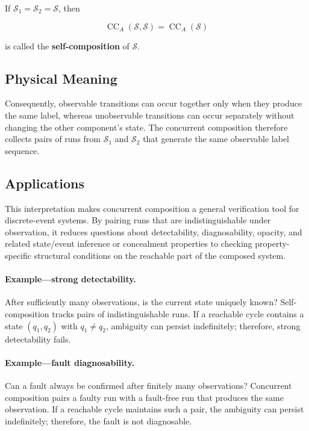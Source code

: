 \documentclass[11pt]{article}
\begin{document}
If $\mathcal S_1=\mathcal S_2=\mathcal S$, then

\[
\operatorname{CC}_{A}(\mathcal S,\mathcal S)
=\operatorname{CC}_{A}(\mathcal S)
\]

is called the \textbf{self-composition} of $\mathcal S$.

\subsection{Physical Meaning}

Consequently, observable transitions can occur together only when they produce the same label, whereas unobservable transitions can occur separately without changing the other component's state. The concurrent composition therefore collects pairs of runs from $\mathcal S_1$ and $\mathcal S_2$ that generate the same observable label sequence.

\subsection{Applications}

This interpretation makes concurrent composition a general verification tool for discrete-event systems. By pairing runs that are indistinguishable under observation, it reduces questions about detectability, diagnosability, opacity, and related state/event inference or concealment properties to checking property-specific structural conditions on the reachable part of the composed system.

\paragraph{Example---strong detectability.}
After sufficiently many observations, is the current state uniquely known? Self-composition tracks pairs of indistinguishable runs. If a reachable cycle contains a state $(q_1,q_2)$ with $q_1\neq q_2$, ambiguity can persist indefinitely; therefore, strong detectability fails.

\paragraph{Example---fault diagnosability.}
Can a fault always be confirmed after finitely many observations? Concurrent composition pairs a faulty run with a fault-free run that produces the same observation. If a reachable cycle maintains such a pair, the ambiguity can persist indefinitely; therefore, the fault is not diagnosable.
\end{document}
